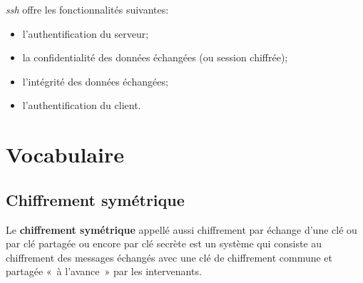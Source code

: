 \documentclass[a4paper,11pt]{article}
\begin{document}
\emph{ssh} offre les fonctionnalités suivantes:

\begin{itemize}
	\item l'authentification du serveur;
	\item la confidentialité des données échangées (ou session chiffrée);
	\item l'intégrité des données échangées;
	\item l'authentification du client.
\end{itemize}



\section{Vocabulaire}
\label{vocabulaire}

\secttoc

\subsection{Chiffrement symétrique}
\label{chiffrement-symétrique}

Le \textbf{chiffrement symétrique} appellé aussi chiffrement par échange
d'une clé ou par clé partagée ou encore par clé secrète est un système
qui consiste au chiffrement des messages échangés avec une clé de
chiffrement commune et partagée «~à l'avance~» par les intervenants.

\begin{center}
\end{center}
\vspace{2cm}
\end{document}
